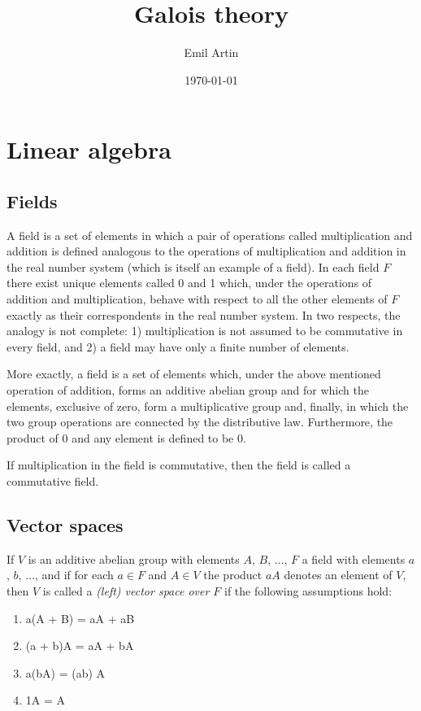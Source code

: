 \documentclass[11pt]{article}
\author{Emil Artin}
\date{\today}
\title{Galois theory}
\theoremstyle{definition}
\begin{document}
\maketitle



\section{Linear algebra}


\subsection{Fields}


A field is a set of elements in which a pair of operations called multiplication and addition is defined analogous to the operations of multiplication and addition in the real number system (which is itself an example of a field).
In each field $F$ there exist unique elements called 0 and 1 which, under the operations of addition and multiplication, behave with respect to all the other elements of $F$ exactly as their correspondents in the real number system.
In two respects, the analogy is not complete: 1) multiplication is not assumed to be commutative in every field, and 2) a field may have only a finite number of elements.

More exactly, a field is a set of elements which, under the above mentioned operation of addition, forms an additive abelian group and for which the elements, exclusive of zero, form a multiplicative group and, finally, in which the two group operations are connected by the distributive law.
Furthermore, the product of 0 and any element is defined to be 0.

If multiplication in the field is commutative, then the field is called a commutative field.


\subsection{Vector spaces}

If $V$ is an additive abelian group with elements $A$, $B$, $\ldots$, $F$ a field with elements $a$, $b$, $\ldots$, and if for each $a \in F$ and $A \in V$ the product $aA$ denotes an element of $V$, then $V$ is called a \emph{(left) vector space over $F$} if the following assumptions hold:

\begin{enumerate}
\item
a(A + B) = aA + aB

\item
(a + b)A = aA + bA

\item
a(bA) = (ab) A

\item
1A = A
\end{enumerate}
\end{document}
